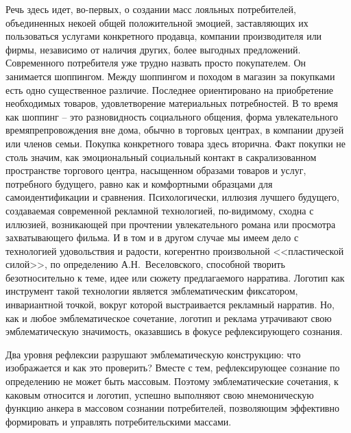 Речь здесь идет, во-первых, о создании масс лояльных потребителей, объединенных
некоей общей положительной эмоцией, заставляющих их  пользоваться услугами
конкретного продавца, компании производителя или фирмы, независимо от наличия
других, более выгодных предложений. Современного потребителя уже трудно назвать
просто покупателем. Он занимается шоппингом. Между шоппингом и походом в магазин
за покупками есть одно существенное различие. Последнее ориентировано на
приобретение необходимых товаров, удовлетворение материальных потребностей. В
то время как шоппинг – это разновидность социального общения, форма
увлекательного времяпрепровождения вне дома, обычно в торговых центрах, в
компании друзей или членов семьи. Покупка конкретного товара здесь вторична.
Факт покупки не столь значим, как эмоциональный социальный контакт в
сакрализованном пространстве торгового центра, насыщенном образами товаров и
услуг, потребного будущего, равно как и комфортными образцами для
самоидентификации и сравнения. Психологически, иллюзия лучшего будущего,
создаваемая современной рекламной технологией, по-видимому, сходна с иллюзией,
возникающей при прочтении увлекательного романа или просмотра захватывающего
фильма. И в том и в другом случае мы имеем дело с технологией удовольствия и
радости, когерентно произвольной <<пластической силой>>, по определению
А.Н.~Веселовского, способной творить безотносительно к теме, идее или сюжету
предлагаемого нарратива. Логотип как инструмент такой технологии является
эмблематическим фиксатором,  инвариантной точкой, вокруг которой выстраивается
рекламный нарратив. Но, как и любое эмблематическое сочетание, логотип и
реклама утрачивают свою эмблематическую значимость, оказавшись в фокусе
рефлексирующего сознания.

Два уровня рефлексии разрушают эмблематическую конструкцию: что изображается и
как это проверить? Вместе с тем, рефлексирующее сознание по определению не
может быть массовым. Поэтому эмблематические сочетания, к каковым относится
и логотип, успешно выполняют свою мнемоническую функцию анкера в массовом
сознании потребителей, позволяющим эффективно формировать и управлять
потребительскими массами.

